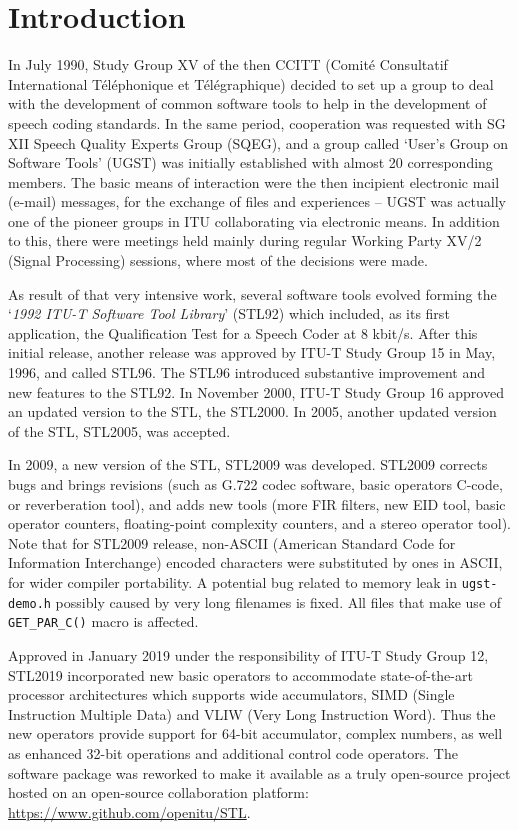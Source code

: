 
\chapter{Introduction}

In July 1990, Study Group XV of the then CCITT (Comit\'e Consultatif International T\'el\'epho\-nique et T\'el\'egraphique) decided to set up a group to deal with the development of common software tools to help in the development of speech coding standards.
In the same period, cooperation was requested with SG XII Speech Quality Experts Group (SQEG), and a group called `{U}ser's Group on Software Tools' (UGST) was initially established with almost 20 corresponding members.
The basic means of interaction were the then incipient electronic mail (e-mail) messages, for the exchange of files and experiences -- UGST was actually one of the pioneer groups in ITU collaborating via electronic means.
In addition to this, there were meetings held mainly during regular Working Party XV/2 (Signal Processing) sessions, where most of the decisions were made.

As result of that very intensive work, several software tools evolved forming the `{\em 1992 ITU-T Software Tool Library}' (STL92) which
included, as its first application, the Qualification Test for a Speech Coder at 8 kbit/s.
After this initial release, another release was approved by ITU-T Study Group 15 in May, 1996, and called STL96.
The STL96 introduced substantive improvement and new features to the STL92.
In November 2000, ITU-T Study Group 16 approved an updated version to the STL, the STL2000.
In 2005, another updated version of the STL, STL2005, was accepted.

In 2009, a new version of the STL, STL2009 was developed.
STL2009 corrects bugs and brings revisions (such as G.722 codec software, basic operators C-code, or reverberation tool), and adds new tools (more FIR filters, new EID tool, basic operator counters, floating-point complexity counters, and a stereo operator tool).
Note that for STL2009 release, non-ASCII (American Standard Code for Information Interchange) encoded characters were substituted by ones in ASCII, for wider compiler portability.
A potential bug related to memory leak in \texttt{ugst-demo.h} possibly caused by very long filenames is fixed.
All files that make use of \texttt{GET\_PAR\_C()} macro is affected.

Approved in January 2019 under the responsibility of ITU-T Study Group 12, STL2019 incorporated new basic operators to accommodate state-of-the-art processor architectures which supports wide accumulators, SIMD (Single Instruction Multiple Data) and VLIW (Very Long Instruction Word).
Thus the new operators provide support for 64-bit accumulator, complex numbers, as well as enhanced 32-bit operations and additional control code operators.
The software package was reworked to make it available as a truly open-source project hosted on an open-source collaboration platform: \url{https://www.github.com/openitu/STL}.

